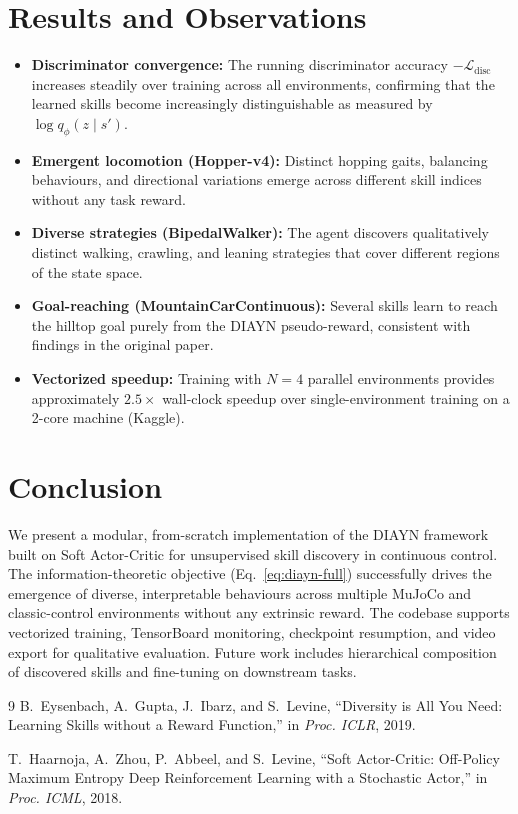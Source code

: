 \documentclass[11pt,a4paper]{article}
\begin{document}
\section{Results and Observations}

\begin{itemize}[nosep,leftmargin=*]
    \item \textbf{Discriminator convergence:} The running discriminator accuracy $-\mathcal{L}_{\text{disc}}$ increases steadily over training across all environments, confirming that the learned skills become increasingly distinguishable as measured by $\log q_\phi(z \mid s')$.
    \item \textbf{Emergent locomotion (Hopper-v4):} Distinct hopping gaits, balancing behaviours, and directional variations emerge across different skill indices without any task reward.
    \item \textbf{Diverse strategies (BipedalWalker):} The agent discovers qualitatively distinct walking, crawling, and leaning strategies that cover different regions of the state space.
    \item \textbf{Goal-reaching (MountainCarContinuous):} Several skills learn to reach the hilltop goal purely from the DIAYN pseudo-reward, consistent with findings in the original paper.
    \item \textbf{Vectorized speedup:} Training with $N{=}4$ parallel environments provides approximately $2.5\times$ wall-clock speedup over single-environment training on a 2-core machine (Kaggle).
\end{itemize}

\section{Conclusion}

We present a modular, from-scratch implementation of the DIAYN framework built on Soft Actor-Critic for unsupervised skill discovery in continuous control. The information-theoretic objective (Eq.~\ref{eq:diayn-full}) successfully drives the emergence of diverse, interpretable behaviours across multiple MuJoCo and classic-control environments without any extrinsic reward. The codebase supports vectorized training, TensorBoard monitoring, checkpoint resumption, and video export for qualitative evaluation. Future work includes hierarchical composition of discovered skills and fine-tuning on downstream tasks.

\begin{thebibliography}{9}
B.~Eysenbach, A.~Gupta, J.~Ibarz, and S.~Levine, ``Diversity is All You Need: Learning Skills without a Reward Function,'' in \emph{Proc. ICLR}, 2019.

T.~Haarnoja, A.~Zhou, P.~Abbeel, and S.~Levine, ``Soft Actor-Critic: Off-Policy Maximum Entropy Deep Reinforcement Learning with a Stochastic Actor,'' in \emph{Proc. ICML}, 2018.
\end{thebibliography}
\end{document}
